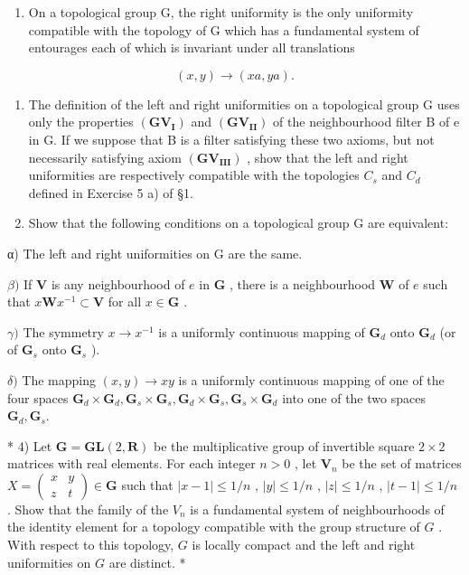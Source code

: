 \BourbakiExerciseGroup

\begin{enumerate}
\def\labelenumi{\arabic{enumi})}
\tightlist
\item
  On a topological group G, the right uniformity is the only uniformity compatible with the topology of G which has a fundamental system of entourages each of which is invariant under all translations
\end{enumerate}

\[
(x, y) \rightarrow (x a, y a).
\]

\begin{enumerate}
\def\labelenumi{\arabic{enumi})}
\setcounter{enumi}{1}
\item
  The definition of the left and right uniformities on a topological group G uses only the properties \((\mathbf{GV}_{\mathbf{I}})\) and \((\mathbf{GV}_{\mathbf{II}})\) of the neighbourhood filter B of e in G. If we suppose that B is a filter satisfying these two axioms, but not necessarily satisfying axiom \((\mathbf{GV}_{\mathbf{III}})\) , show that the left and right uniformities are respectively compatible with the topologies \(C_{s}\) and \(C_{d}\) defined in Exercise 5 a) of §1.
\item
  Show that the following conditions on a topological group G are equivalent:
\end{enumerate}

α) The left and right uniformities on G are the same.

\(\beta)\) If \(\mathbf{V}\) is any neighbourhood of \(e\) in \(\mathbf{G}\) , there is a neighbourhood \(\mathbf{W}\) of \(e\) such that \(x\mathbf{W}x^{-1} \subset \mathbf{V}\) for all \(x \in \mathbf{G}\) .

\(\gamma)\) The symmetry \(x \to x^{-1}\) is a uniformly continuous mapping of \(\mathbf{G}_d\) onto \(\mathbf{G}_d\) (or of \(\mathbf{G}_s\) onto \(\mathbf{G}_s\) ).

\(\delta)\) The mapping \((x,y)\to xy\) is a uniformly continuous mapping of one of the four spaces \(\mathbf{G}_d\times \mathbf{G}_d,\mathbf{G}_s\times \mathbf{G}_s,\mathbf{G}_d\times \mathbf{G}_s,\mathbf{G}_s\times \mathbf{G}_d\) into one of the two spaces \(\mathbf{G}_d,\mathbf{G}_s.\)

* 4) Let \(\mathbf{G} = \mathbf{GL}(2, \mathbf{R})\) be the multiplicative group of invertible square \(2 \times 2\) matrices with real elements. For each integer \(n > 0\) , let \(\mathbf{V}_n\) be the set of matrices \(X = \begin{pmatrix} x & y \\ z & t \end{pmatrix} \in \mathbf{G}\) such that \(|x - 1| \leqslant 1/n\) , \(|y| \leqslant 1/n\) , \(|z| \leqslant 1/n\) , \(|t - 1| \leqslant 1/n\) . Show that the family of the \(V_n\) is a fundamental system of neighbourhoods of the identity element for a topology compatible with the group structure of \(G\) . With respect to this topology, \(G\) is locally compact and the left and right uniformities on \(G\) are distinct. *


